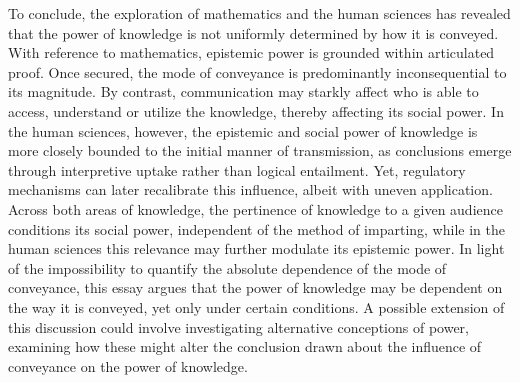 \documentclass[12pt]{article}
\begin{document}
To conclude, the exploration of mathematics and the human sciences has revealed that the power of knowledge is not uniformly determined by how it is conveyed. With reference to mathematics, epistemic power is grounded within articulated proof. Once secured, the mode of conveyance is predominantly inconsequential to its magnitude. By contrast, communication may starkly affect who is able to access, understand or utilize the knowledge, thereby affecting its social power. In the human sciences, however, the epistemic and social power of knowledge is more closely bounded to the initial manner of transmission, as conclusions emerge through interpretive uptake rather than logical entailment. Yet, regulatory mechanisms can later recalibrate this influence, albeit with uneven application. Across both areas of knowledge, the pertinence of knowledge to a given audience conditions its social power, independent of the method of imparting, while in the human sciences this relevance may further modulate its epistemic power. In light of the impossibility to quantify the absolute dependence of the mode of conveyance, this essay argues that the power of knowledge may be dependent on the way it is conveyed, yet only under certain conditions. A possible extension of this discussion could involve investigating alternative conceptions of power, examining how these might alter the conclusion drawn about the influence of conveyance on the power of knowledge.





	
	
	
	

	
	
	
	
	
	
	\clearpage
	
	\printbibliography
	
	\clearpage
	
\end{document}
